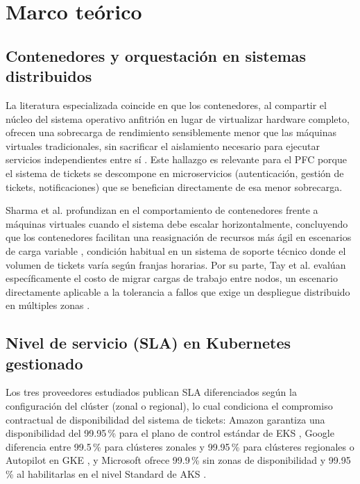 \documentclass[12pt, a4paper]{article}
\begin{document}
\section{Marco teórico}

\subsection{Contenedores y orquestación en sistemas distribuidos}
La literatura especializada coincide en que los contenedores, al compartir el núcleo del sistema operativo anfitrión en lugar de virtualizar hardware completo, ofrecen una sobrecarga de rendimiento sensiblemente menor que las máquinas virtuales tradicionales, sin sacrificar el aislamiento necesario para ejecutar servicios independientes entre sí \cite{felter2015updated}. Este hallazgo es relevante para el PFC porque el sistema de tickets se descompone en microservicios (autenticación, gestión de tickets, notificaciones) que se benefician directamente de esa menor sobrecarga.

Sharma et al. profundizan en el comportamiento de contenedores frente a máquinas virtuales cuando el sistema debe escalar horizontalmente, concluyendo que los contenedores facilitan una reasignación de recursos más ágil en escenarios de carga variable \cite{sharma2016containers}, condición habitual en un sistema de soporte técnico donde el volumen de tickets varía según franjas horarias. Por su parte, Tay et al. evalúan específicamente el costo de migrar cargas de trabajo entre nodos, un escenario directamente aplicable a la tolerancia a fallos que exige un despliegue distribuido en múltiples zonas \cite{tay2017performance}.

\subsection{Nivel de servicio (SLA) en Kubernetes gestionado}
Los tres proveedores estudiados publican SLA diferenciados según la configuración del clúster (zonal o regional), lo cual condiciona el compromiso contractual de disponibilidad del sistema de tickets: Amazon garantiza una disponibilidad del 99.95\,\% para el plano de control estándar de EKS \cite{aws_eks_sla}, Google diferencia entre 99.5\,\% para clústeres zonales y 99.95\,\% para clústeres regionales o Autopilot en GKE \cite{gcp_gke_sla}, y Microsoft ofrece 99.9\,\% sin zonas de disponibilidad y 99.95\,\% al habilitarlas en el nivel Standard de AKS \cite{azure_aks_sla}.
\end{document}
